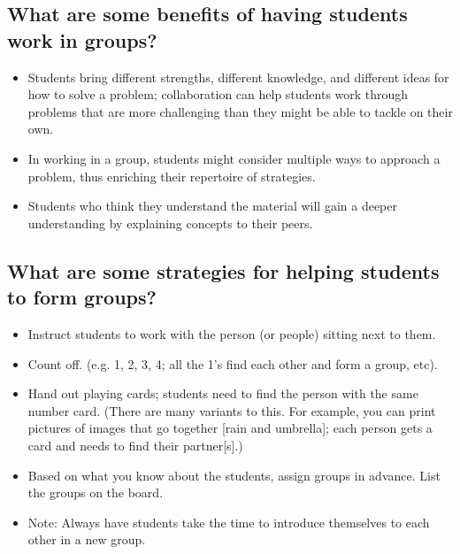 \subsection{What are some benefits of having students work in groups?}
\label{sec:what-are-some}

\begin{itemize}
\item Students bring different strengths, different knowledge, and different ideas for how to solve a problem; collaboration can help students work through problems that are more challenging than they might be able to tackle on their own.
  
\item In working in a group, students might consider multiple ways to approach a problem, thus enriching their repertoire of strategies.
  
\item Students who think they understand the material will gain a deeper understanding by explaining concepts to their peers.
\end{itemize}

\subsection{What are some strategies for helping students to form groups?}
\label{sec:what-are-some-1}
\begin{itemize}
\item Instruct students to work with the person (or people) sitting next to them.
\item Count off.  (e.g. 1, 2, 3, 4; all the 1’s find each other and form a group, etc).
\item Hand out playing cards; students need to find the person with the same number card. (There are many variants to this.  For example, you can print pictures of images that go together [rain and umbrella]; each person gets a card and needs to find their partner[s].)
\item Based on what you know about the students, assign groups in advance. List the groups on the board.
\item Note: Always have students take the time to introduce themselves to each other in a new group.
\end{itemize}

